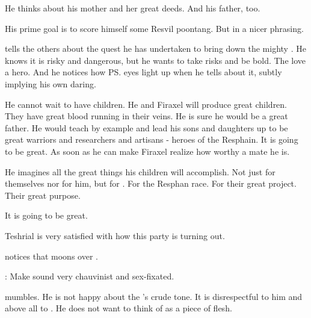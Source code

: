 He thinks about his mother and her great deeds. 
And his father, too. 

His prime goal is to score himself some Resvil poontang. 
But in a nicer phrasing. 

\Teshrial{} tells the others about the quest he has undertaken to bring down the mighty \Ishnaruchaefir. 
He knows it is risky and dangerous, but he wants to take risks and be bold. 
The \resviel{} love a hero. 
And he notices how \ps{\Firaxel} eyes light up when he tells about it, subtly implying his own daring. 


He cannot wait to have children. 
He and Firaxel will produce great children. 
They have great blood running in their veins. 
He is sure he would be a great father. 
He would teach by example and lead his sons and daughters up to be great warriors and researchers and artisans - heroes of the Resphain. 
It is going to be great. 
As soon as he can make Firaxel realize how worthy a mate he is. 

He imagines all the great things his children will accomplish. 
Not just for themselves nor for him, but for \CiriathSepher.
For the Resphan race. 
For their great project. 
Their great purpose. 

It is going to be great.

Teshrial is very satisfied with how this party is turning out. 







\begin{comment}
\subsection{Dezruth}
\end{comment}
\new
\Dezruth notices that \Teshrial moons over \Firaxel.

\Dezruth:
Make \Dezruth sound very chauvinist and sex-fixated.

\Teshrial mumbles.
He is not happy about the \Mystraacht's crude tone. 
It is disrespectful to him and above all to \Firaxel.
He does not want to think of \Firaxel as a piece of flesh.

